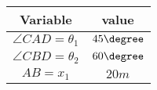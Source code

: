 
\begin{tabular}{|c|c|}

\hline
\textbf{Variable} & \textbf{value}\\
 \hline
$\angle CAD = \theta_1$ & $45\degree$\\
 \hline
$\angle CBD = \theta_2$ & $60\degree$\\
 \hline
$AB = x_1$ & $20m$\\ 
 \hline

\end{tabular}

